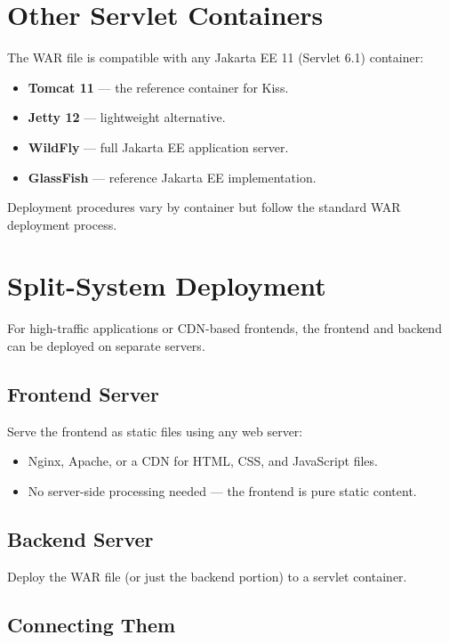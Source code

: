 \section{Other Servlet Containers}
\label{sec:deploy-other}

The WAR file is compatible with any Jakarta EE 11 (Servlet 6.1) container:

\begin{itemize}
  \item \textbf{Tomcat 11} --- the reference container for Kiss.
  \item \textbf{Jetty 12} --- lightweight alternative.
  \item \textbf{WildFly} --- full Jakarta EE application server.
  \item \textbf{GlassFish} --- reference Jakarta EE implementation.
\end{itemize}

\noindent
Deployment procedures vary by container but follow the standard WAR deployment process.

\section{Split-System Deployment}
\label{sec:deploy-split}

For high-traffic applications or CDN-based frontends, the frontend and backend can be deployed on separate servers.

\subsection{Frontend Server}

Serve the frontend as static files using any web server:

\begin{itemize}
  \item Nginx, Apache, or a CDN for HTML, CSS, and JavaScript files.
  \item No server-side processing needed --- the frontend is pure static content.
\end{itemize}

\subsection{Backend Server}

Deploy the WAR file (or just the backend portion) to a servlet container.

\subsection{Connecting Them}

